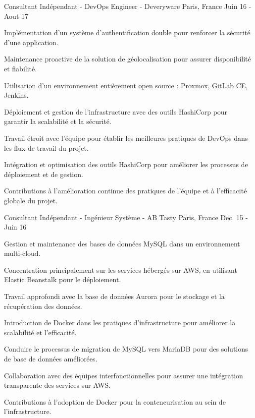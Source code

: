 \begin{cventries}
        \cventry
        {Consultant Indépendant - DevOps Engineer -} %
        {Deveryware} %
        {Paris, France} %
        {Juin 16 - Aout 17} %
        {
          \begin{cvitems} %
            \item {Implémentation d'un système d'authentification double pour renforcer la sécurité d'une application.}
            \item {Maintenance proactive de la solution de géolocalisation pour assurer disponibilité et fiabilité.}
            \item {Utilisation d'un environnement entièrement open source : Proxmox, GitLab CE, Jenkins.}
            \item {Déploiement et gestion de l'infrastructure avec des outils HashiCorp pour garantir la scalabilité et la sécurité.}
            \item {Travail étroit avec l'équipe pour établir les meilleures pratiques de DevOps dans les flux de travail du projet.}
            \item {Intégration et optimisation des outils HashiCorp pour améliorer les processus de déploiement et de gestion.}
            \item {Contributions à l'amélioration continue des pratiques de l'équipe et à l'efficacité globale du projet.}
          \end{cvitems}
        }

\cventry
{Consultant Indépendant - Ingénieur Système - } %
{AB Tasty} %
{Paris, France} %
{Dec. 15 - Juin 16} %
{
  \begin{cvitems} %
    \item {Gestion et maintenance des bases de données MySQL dans un environnement multi-cloud.}
    \item {Concentration principalement sur les services hébergés sur AWS, en utilisant Elastic Beanstalk pour le déploiement.}
    \item {Travail approfondi avec la base de données Aurora pour le stockage et la récupération des données.}
    \item {Introduction de Docker dans les pratiques d'infrastructure pour améliorer la scalabilité et l'efficacité.}
    \item {Conduire le processus de migration de MySQL vers MariaDB pour des solutions de base de données améliorées.}
    \item {Collaboration avec des équipes interfonctionnelles pour assurer une intégration transparente des services sur AWS.}
    \item {Contributions à l'adoption de Docker pour la conteneurisation au sein de l'infrastructure.}
  \end{cvitems}
}


\end{cventries}


